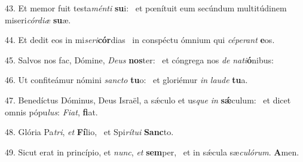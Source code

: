 43. Et memor fuit testa\textit{mén}\textit{ti} \textbf{su}i: \ast\  et pœnítuit eum secúndum multitúdinem miseri\textit{cór}\textit{di}\textit{æ} \textbf{su}æ.\

44. Et dedit eos in mi\textit{se}\textit{ri}\textbf{cór}dias \ast\  in conspéctu ómnium qui \textit{cé}\textit{pe}\textit{rant} \textbf{e}os.\

45. Salvos nos fac, Dómine, \textit{De}\textit{us} \textbf{nos}ter: \ast\  et cóngrega nos \textit{de} \textit{na}\textit{ti}\textbf{ó}nibus:\

46. Ut confiteámur nómini \textit{sanc}\textit{to} \textbf{tu}o: \ast\  et gloriémur \textit{in} \textit{lau}\textit{de} \textbf{tu}a.\

47. Benedíctus Dóminus, Deus Israël, a sǽculo et us\textit{que} \textit{in} \textbf{sǽ}culum: \ast\  et dicet omnis pópu\textit{lus}: \textit{Fi}\textit{at}, \textbf{fi}at.\

48. Glória Pa\textit{tri}, \textit{et} \textbf{Fí}lio, \ast\  et Spi\textit{rí}\textit{tu}\textit{i} \textbf{Sanc}to.\

49. Sicut erat in princípio, et \textit{nunc}, \textit{et} \textbf{sem}per, \ast\  et in sǽcula sæ\textit{cu}\textit{ló}\textit{rum}. \textbf{A}men.\

